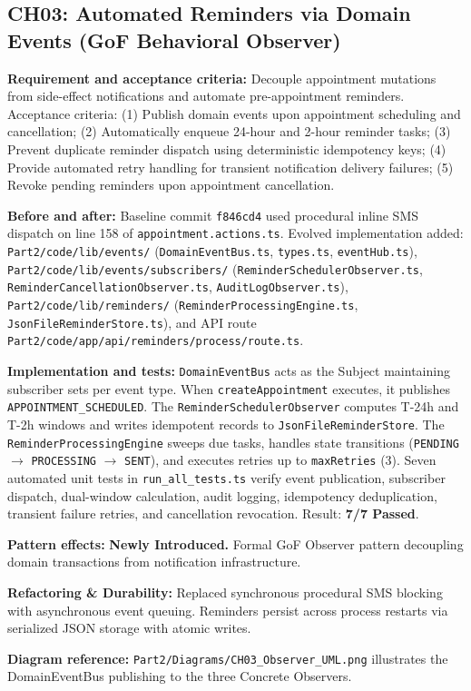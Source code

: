\documentclass[11pt,a4paper]{article}
\newcommand{\entry}[2]{\textbf{#1:} #2\par}
\begin{document}
\subsection{CH03: Automated Reminders via Domain Events (GoF Behavioral Observer)}
\entry{Requirement and acceptance criteria}{Decouple appointment mutations from side-effect notifications and automate pre-appointment reminders. Acceptance criteria: (1) Publish domain events upon appointment scheduling and cancellation; (2) Automatically enqueue 24-hour and 2-hour reminder tasks; (3) Prevent duplicate reminder dispatch using deterministic idempotency keys; (4) Provide automated retry handling for transient notification delivery failures; (5) Revoke pending reminders upon appointment cancellation.}
\entry{Before and after}{Baseline commit \texttt{f846cd4} used procedural inline SMS dispatch on line 158 of \texttt{appointment.actions.ts}. Evolved implementation added: \texttt{Part2/code/lib/events/} (\texttt{DomainEventBus.ts}, \texttt{types.ts}, \texttt{eventHub.ts}), \texttt{Part2/code/lib/events/subscribers/} (\texttt{ReminderSchedulerObserver.ts}, \texttt{ReminderCancellationObserver.ts}, \texttt{AuditLogObserver.ts}), \texttt{Part2/code/lib/reminders/} (\texttt{ReminderProcessingEngine.ts}, \texttt{JsonFileReminderStore.ts}), and API route \texttt{Part2/code/app/api/reminders/process/route.ts}.}
\entry{Implementation and tests}{\texttt{DomainEventBus} acts as the Subject maintaining subscriber sets per event type. When \texttt{createAppointment} executes, it publishes \texttt{APPOINTMENT\_SCHEDULED}. The \texttt{ReminderSchedulerObserver} computes T-24h and T-2h windows and writes idempotent records to \texttt{JsonFileReminderStore}. The \texttt{ReminderProcessingEngine} sweeps due tasks, handles state transitions (\texttt{PENDING} $\to$ \texttt{PROCESSING} $\to$ \texttt{SENT}), and executes retries up to \texttt{maxRetries} (3). Seven automated unit tests in \texttt{run\_all\_tests.ts} verify event publication, subscriber dispatch, dual-window calculation, audit logging, idempotency deduplication, transient failure retries, and cancellation revocation. Result: \textbf{7/7 Passed}.}
\entry{Pattern effects}{\textbf{Newly Introduced.} Formal GoF Observer pattern decoupling domain transactions from notification infrastructure.}
\entry{Refactoring \& Durability}{Replaced synchronous procedural SMS blocking with asynchronous event queuing. Reminders persist across process restarts via serialized JSON storage with atomic writes.}
\entry{Diagram reference}{\texttt{Part2/Diagrams/CH03\_Observer\_UML.png} illustrates the DomainEventBus publishing to the three Concrete Observers.}
\end{document}
